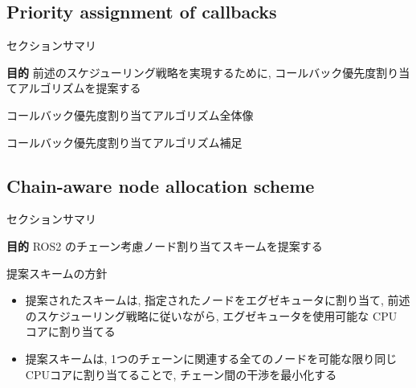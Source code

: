 \subsection{Priority assignment of callbacks}
\label{ssec: priority assignment of callbacks}

\begin{frame}{セクションサマリ}
    \begin{itembox}[l]{\textbf{目的}}
        前述のスケジューリング戦略を実現するために, コールバック優先度割り当てアルゴリズムを提案する
    \end{itembox}
\end{frame}

\begin{frame}{コールバック優先度割り当てアルゴリズム全体像}
\end{frame}

\begin{frame}[label=alg1]{コールバック優先度割り当てアルゴリズム補足}
\end{frame}


\subsection{Chain-aware node allocation scheme}
\label{ssec: chain-aware node allocation scheme}

\begin{frame}{セクションサマリ}
    \begin{itembox}[l]{\textbf{目的}}
        ROS2 のチェーン考慮ノード割り当てスキームを提案する
    \end{itembox}
\end{frame}

\begin{frame}{提案スキームの方針}
    \begin{itemize}
        \item 提案されたスキームは, 指定されたノードをエグゼキュータに割り当て, 前述のスケジューリング戦略に従いながら, エグゼキュータを使用可能な CPU コアに割り当てる
        \item 提案スキームは, 1つのチェーンに関連する全てのノードを可能な限り同じCPUコアに割り当てることで, チェーン間の干渉を最小化する
    \end{itemize}
\end{frame}


